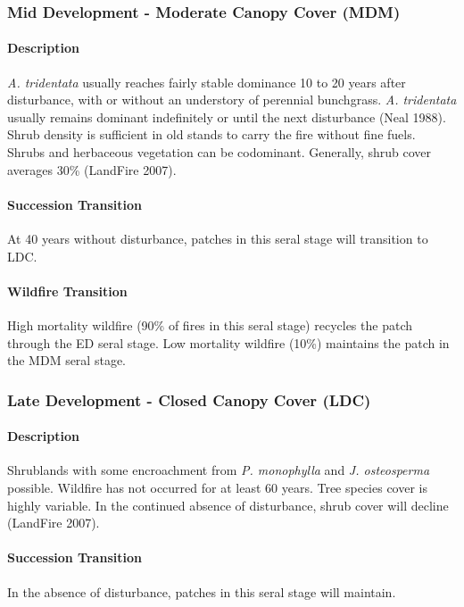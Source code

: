 \noindent\hrulefill


\subsubsection*{Mid Development - Moderate Canopy Cover (MDM)}

\paragraph*{Description} \emph{A. tridentata} usually reaches fairly stable dominance 10 to 20 years after disturbance, with or without an understory of perennial bunchgrass. \emph{A. tridentata} usually remains dominant indefinitely or until the next disturbance (Neal 1988). Shrub density is sufficient in old stands to carry the fire without fine fuels. Shrubs and herbaceous vegetation can be codominant. Generally, shrub cover averages 30\% (LandFire 2007).

\paragraph*{Succession Transition} At 40 years without disturbance, patches in this seral stage will transition to LDC. 

\paragraph*{Wildfire Transition} High mortality wildfire (90\% of fires in this seral stage) recycles the patch through the ED seral stage. Low mortality wildfire (10\%) maintains the patch in the MDM seral stage.

\noindent\hrulefill


\subsubsection*{Late Development - Closed Canopy Cover (LDC)}

\paragraph*{Description} Shrublands with some encroachment from \emph{P. monophylla} and \emph{J. osteosperma} possible. Wildfire has not occurred for at least 60 years. Tree species cover is highly variable. In the continued absence of disturbance, shrub cover will decline (LandFire 2007).

\paragraph*{Succession Transition} In the absence of disturbance, patches in this seral stage will maintain. 

